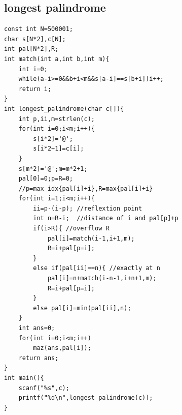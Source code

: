 \documentclass[10pt,twocolumn,oneside]{article}
\begin{document}
\subsection{longest palindrome}
\begin{lstlisting}
const int N=500001;
char s[N*2],c[N];
int pal[N*2],R;
int match(int a,int b,int m){
	int i=0;
	while(a-i>=0&&b+i<m&&s[a-i]==s[b+i])i++;
	return i;
}
int longest_palindrome(char c[]){
	int p,ii,m=strlen(c);
	for(int i=0;i<m;i++){
		s[i*2]='@';
		s[i*2+1]=c[i];
	}
	s[m*2]='@';m=m*2+1;
	pal[0]=0;p=R=0;
	//p=max_idx{pal[i]+i},R=max{pal[i]+i}
	for(int i=1;i<m;i++){
		ii=p-(i-p); //reflextion point
		int n=R-i;  //distance of i and pal[p]+p 
		if(i>R){ //overflow R
			pal[i]=match(i-1,i+1,m);
			R=i+pal[p=i];
		}
		else if(pal[ii]==n){ //exactly at n
			pal[i]=n+match(i-n-1,i+n+1,m);
			R=i+pal[p=i];
		}
		else pal[i]=min(pal[ii],n);
	}
	int ans=0;
	for(int i=0;i<m;i++)
		maz(ans,pal[i]);
	return ans;
}
int main(){
	scanf("%s",c);
	printf("%d\n",longest_palindrome(c));
}

\end{lstlisting}
\end{document}
